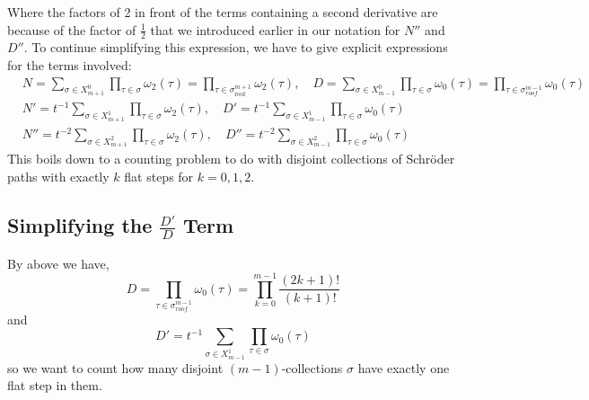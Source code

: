 \documentclass[11pt]{article}
\theoremstyle{definition}
\theoremstyle{definition}
\theoremstyle{plain}
\theoremstyle{plain}
\theoremstyle{plain}
\theoremstyle{definition}
\begin{document}
Where the factors of 2 in front of the terms containing a second derivative are because of the factor of $\frac{1}{2}$ that we introduced earlier in our notation for $N''$ and $D''$. To continue simplifying this expression, we have to give explicit expressions for the terms involved:
\begin{align*}
&N = \sum\limits_{\sigma\in X_{m+1}^0}\prod\limits_{\tau\in\sigma}\omega_2(\tau) = \prod\limits_{\tau\in\sigma_{\text{roof}}^{m+1}}\omega_2(\tau),\quad D = \sum\limits_{\sigma\in X_{m-1}^0}\prod\limits_{\tau\in\sigma}\omega_0(\tau) = \prod\limits_{\tau\in\sigma_{roof}^{m-1}}\omega_0(\tau) \\
&N' = t^{-1}\sum\limits_{\sigma\in X_{m+1}^1}\prod\limits_{\tau\in\sigma}\omega_2(\tau),\quad D' = t^{-1}\sum\limits_{\sigma\in X_{m-1}^1}\prod\limits_{\tau\in\sigma}\omega_0(\tau) \\
&N'' = t^{-2}\sum\limits_{\sigma\in X_{m+1}^2}\prod\limits_{\tau\in\sigma}\omega_2(\tau),\quad D'' = t^{-2}\sum\limits_{\sigma\in X_{m-1}^2}\prod\limits_{\tau\in\sigma}\omega_0(\tau)
\end{align*}
This boils down to a counting problem to do with disjoint collections of Schröder paths with exactly $k$ flat steps for $k = 0,1,2$.

\subsection{Simplifying the $\frac{D'}{D}$ Term}

By above we have,
\begin{equation*}
D = \prod\limits_{\tau\in\sigma_{roof}^{m-1}}\omega_0(\tau) = \prod\limits_{k=0}^{m-1}\frac{(2k+1)!}{(k+1)!}
\end{equation*}
and
\begin{equation*}
D' = t^{-1}\sum\limits_{\sigma\in X_{m-1}^1}\prod\limits_{\tau\in\sigma}\omega_0(\tau)
\end{equation*}
so we want to count how many disjoint $(m-1)$-collections $\sigma$ have exactly one flat step in them.
\end{document}
